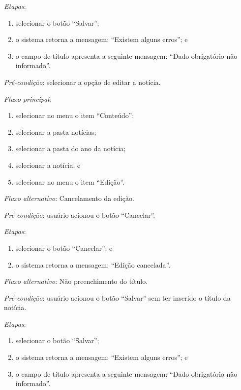 \noindent \textit{Etapas}:

\begin{enumerate}
    \item selecionar o botão ``Salvar'';
    \item o sistema retorna a mensagem: ``Existem alguns erros''; e
    \item o campo de título apresenta a seguinte mensagem: ``Dado obrigatório não informado''.
\end{enumerate}




\vspace{0.7cm}

\noindent \textit{Pré-condição}: selecionar a opção de editar a notícia.

\noindent \textit{Fluxo principal}:

\begin{enumerate}
    \item selecionar no menu o item ``Conteúdo'';
    \item selecionar a pasta notícias;
    \item selecionar a pasta do ano da notícia;
    \item selecionar a notícia; e
    \item selecionar no menu o item ``Edição''.
\end{enumerate}

\noindent \textit{Fluxo alternativo}: Cancelamento da edição.

\noindent \textit{Pré-condição}: usuário acionou o botão ``Cancelar''.

\noindent \textit{Etapas}:

\begin{enumerate}
    \item selecionar o botão ``Cancelar''; e
    \item o sistema retorna a mensagem: ``Edição cancelada''.
\end{enumerate}

\noindent \textit{Fluxo alternativo}: Não preenchimento do título.

\noindent \textit{Pré-condição}: usuário acionou o botão ``Salvar'' sem ter inserido o título da notícia.

\noindent \textit{Etapas}:

\begin{enumerate}
    \item selecionar o botão ``Salvar'';
    \item o sistema retorna a mensagem: ``Existem alguns erros''; e
    \item o campo de título apresenta a seguinte mensagem: ``Dado obrigatório não informado''.
\end{enumerate}




